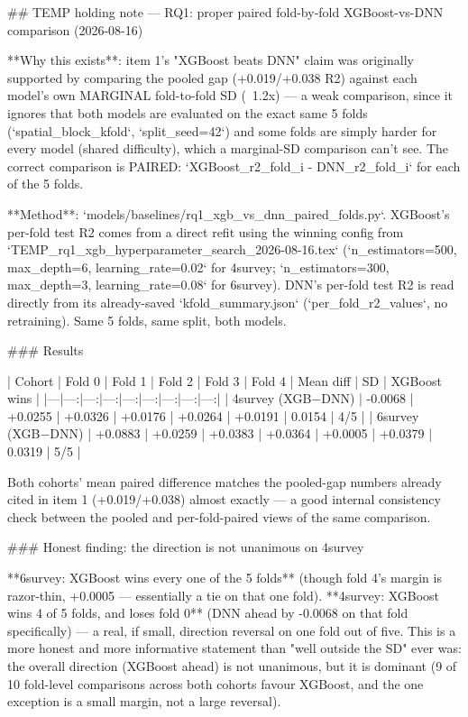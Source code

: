 ## TEMP holding note — RQ1: proper paired fold-by-fold XGBoost-vs-DNN comparison (2026-08-16)

**Why this exists**: item 1's "XGBoost beats DNN" claim was originally supported by comparing the
pooled gap (+0.019/+0.038 R2) against each model's own MARGINAL fold-to-fold SD (~1.2x) — a weak
comparison, since it ignores that both models are evaluated on the exact same 5 folds
(`spatial_block_kfold`, `split_seed=42`) and some folds are simply harder for every model (shared
difficulty), which a marginal-SD comparison can't see. The correct comparison is PAIRED:
`XGBoost_r2_fold_i - DNN_r2_fold_i` for each of the 5 folds.

**Method**: `models/baselines/rq1_xgb_vs_dnn_paired_folds.py`. XGBoost's per-fold test R2 comes
from a direct refit using the winning config from
`TEMP_rq1_xgb_hyperparameter_search_2026-08-16.tex` (`n_estimators=500, max_depth=6,
learning_rate=0.02` for 4survey; `n_estimators=300, max_depth=3, learning_rate=0.08` for
6survey). DNN's per-fold test R2 is read directly from its already-saved `kfold_summary.json`
(`per_fold_r2_values`, no retraining). Same 5 folds, same split, both models.

### Results

| Cohort | Fold 0 | Fold 1 | Fold 2 | Fold 3 | Fold 4 | Mean diff | SD | XGBoost wins |
|---|---:|---:|---:|---:|---:|---:|---:|---:|
| 4survey (XGB−DNN) | -0.0068 | +0.0255 | +0.0326 | +0.0176 | +0.0264 | +0.0191 | 0.0154 | 4/5 |
| 6survey (XGB−DNN) | +0.0883 | +0.0259 | +0.0383 | +0.0364 | +0.0005 | +0.0379 | 0.0319 | 5/5 |

Both cohorts' mean paired difference matches the pooled-gap numbers already cited in item 1
(+0.019/+0.038) almost exactly — a good internal consistency check between the pooled and
per-fold-paired views of the same comparison.

### Honest finding: the direction is not unanimous on 4survey

**6survey: XGBoost wins every one of the 5 folds** (though fold 4's margin is razor-thin, +0.0005
— essentially a tie on that one fold). **4survey: XGBoost wins 4 of 5 folds, and loses fold 0** (DNN
ahead by -0.0068 on that fold specifically) — a real, if small, direction reversal on one fold out
of five. This is a more honest and more informative statement than "well outside the SD" ever was:
the overall direction (XGBoost ahead) is not unanimous, but it is dominant (9 of 10 fold-level
comparisons across both cohorts favour XGBoost, and the one exception is a small margin, not a
large reversal).
